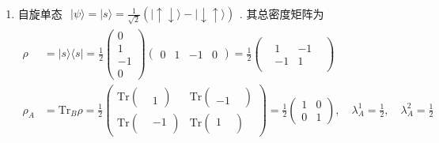 \documentclass[../../main.tex]{subfiles}
\begin{document}
\begin{enumerate}
    \item 自旋单态 $\begin{aligned}
        |\psi\rangle = |s\rangle = \frac{1}{\sqrt{2}}(|\uparrow\downarrow\rangle - |\downarrow\uparrow\rangle)
    \end{aligned}$. 其总密度矩阵为
    \begin{align*}
        \rho &= |s\rangle\langle s| = \frac{1}{2}\begin{pmatrix}
            0 \\ 1 \\ -1 \\ 0
        \end{pmatrix}\begin{pmatrix}
            0 & 1 & -1 & 0
        \end{pmatrix} = \frac{1}{2}\begin{pmatrix}
             & & & \\
                & 1 & -1 & \\
                & -1 & 1 & \\
                & & &
        \end{pmatrix}\\
        \rho_{A} &= \text{Tr}_{B}\rho = \frac{1}{2}\begin{pmatrix}
            \text{Tr}\begin{pmatrix}
                & \\ & 1
            \end{pmatrix} & \text{Tr}\begin{pmatrix}
                & \\ -1 &
            \end{pmatrix} \\ \text{Tr}\begin{pmatrix}
                 & -1 \\ & 
            \end{pmatrix} & \text{Tr}\begin{pmatrix}
                1 & \\ &
            \end{pmatrix}
        \end{pmatrix} = \frac{1}{2}\begin{pmatrix}
            1 & 0 \\ 0 & 1
        \end{pmatrix},\quad \lambda_{A}^{1} = \frac{1}{2}, \quad \lambda_{A}^{2} = \frac{1}{2}\\

\end{align*}
\end{enumerate}
\end{document}
